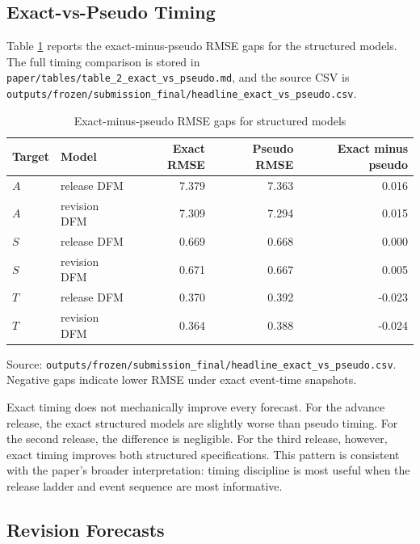 \documentclass[12pt]{article}
\begin{document}
\subsection{Exact-vs-Pseudo Timing}

Table \ref{tab:timing} reports the exact-minus-pseudo RMSE gaps for the structured models. The full timing comparison is stored in \texttt{paper/tables/table\_2\_exact\_vs\_pseudo.md}, and the source CSV is \texttt{outputs/frozen/submission\_final/headline\_exact\_vs\_pseudo.csv}.

\begin{table}[!htbp]
\centering
\begin{threeparttable}
\caption{Exact-minus-pseudo RMSE gaps for structured models}
\label{tab:timing}
\small
\begin{tabular}{llrrr}
\toprule
Target & Model & Exact RMSE & Pseudo RMSE & Exact minus pseudo \\
\midrule
$A$ & release DFM & 7.379 & 7.363 & 0.016 \\
$A$ & revision DFM & 7.309 & 7.294 & 0.015 \\
$S$ & release DFM & 0.669 & 0.668 & 0.000 \\
$S$ & revision DFM & 0.671 & 0.667 & 0.005 \\
$T$ & release DFM & 0.370 & 0.392 & -0.023 \\
$T$ & revision DFM & 0.364 & 0.388 & -0.024 \\
\bottomrule
\end{tabular}
\begin{tablenotes}
\footnotesize
\item Source: \texttt{outputs/frozen/submission\_final/headline\_exact\_vs\_pseudo.csv}. Negative gaps indicate lower RMSE under exact event-time snapshots.
\end{tablenotes}
\end{threeparttable}
\end{table}

Exact timing does not mechanically improve every forecast. For the advance release, the exact structured models are slightly worse than pseudo timing. For the second release, the difference is negligible. For the third release, however, exact timing improves both structured specifications. This pattern is consistent with the paper's broader interpretation: timing discipline is most useful when the release ladder and event sequence are most informative.

\subsection{Revision Forecasts}
\end{document}
